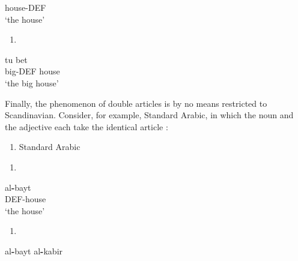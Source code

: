 house-DEF\\ %


‘the house’
\z


\begin{enumerate} %
\item 
\end{enumerate} %
\ea\label{}
\gll tu  bet\\


big-DEF  house\\ %


‘the big house’
\z


Finally, the phenomenon of double articles is by no means restricted to Scandinavian. Consider, for example, Standard Arabic, in which the noun and the adjective each take the identical article :

\begin{enumerate} %
\item 
Standard Arabic

\end{enumerate} %
\setcounter{listLFOxcviiileveli}{0}
\begin{enumerate} %
\item 
\end{enumerate} %
\ea\label{}
\gll al\textbf{{}-}bayt\\


DEF-house\\ %


‘the house’
\z


\begin{enumerate} %
\item 
\end{enumerate} %
\ea\label{}
\gll al\textbf{{}-}bayt  al\textbf{{}-}kabir\\


